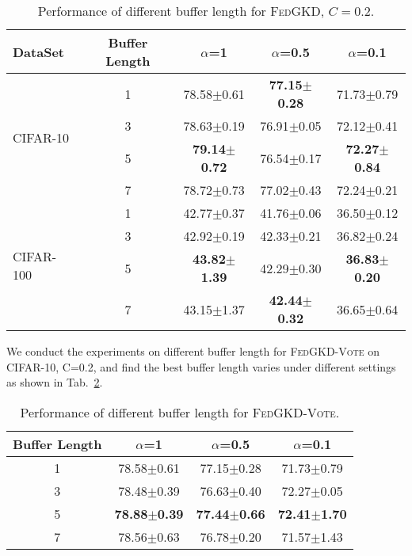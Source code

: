 \documentclass{article} %
\newcommand{\system}{\textsc{FedGKD}\xspace}
\newcommand{\systemled}{\textsc{FedGKD-Vote}\xspace}
\begin{document}
\begin{table}[!htb]
\centering
\small
\caption{Performance of different buffer length for \system, $C=0.2$.}
\begin{tabular}{lcccc}
\hline
  DataSet & Buffer Length &  $\alpha$=1 & $\alpha$=0.5 & $\alpha$=0.1\\
  \hline
   \multirow{4}{*}{CIFAR-10}& 1 & 78.58$\pm$0.61 & \bf{77.15$\pm$0.28} & 71.73$\pm$0.79  \\ 
    &3 & 78.63$\pm$0.19 & 76.91$\pm$0.05 & 72.12$\pm$0.41 \\
    &5 & \bf{79.14$\pm$0.72} & 76.54$\pm$0.17 & \bf{72.27$\pm$0.84}\\
    &7 & 78.72$\pm$0.73 & 77.02$\pm$0.43 & 72.24$\pm$0.21 \\
 \hline
  \multirow{4}{*}{CIFAR-100}& 1 & 42.77$\pm$0.37 & 41.76$\pm$0.06 & 36.50$\pm$0.12  \\ 
    &3 & 42.92$\pm$0.19 & 42.33$\pm$0.21 & 36.82$\pm$0.24 \\
    &5 & \bf{43.82$\pm$1.39} & 42.29$\pm$0.30 & \bf{36.83$\pm$0.20} \\
    &7 & 43.15$\pm$1.37 & \bf{42.44$\pm$0.32} & 36.65$\pm$0.64 \\
    \bottomrule
  \end{tabular}
 
 \label{tbl:avg_teacher_buffer}
\end{table}

We conduct the experiments on different buffer length for \systemled on CIFAR-10, C=0.2, and find the best buffer length varies under different settings as shown in Tab.~\ref{tbl:buffer_length}. 


\begin{table}[h]
\renewcommand\arraystretch{1.1}
\centering
\small
\caption{Performance of different buffer length for \systemled.}
\setlength{\tabcolsep}{2pt} %
\begin{tabular}{cccc}
\hline
  Buffer Length &  $\alpha$=1 & $\alpha$=0.5 & $\alpha$=0.1\\
  \hline
    1 & 78.58$\pm$0.61 & 77.15$\pm$0.28 & 71.73$\pm$0.79  \\ 
    3 & 78.48$\pm$0.39 & 76.63$\pm$0.40 & 72.27$\pm$0.05 \\
    5 & \bf{78.88$\pm$0.39} & \bf{77.44$\pm$0.66} & \bf{72.41$\pm$1.70}\\
    7 & 78.56$\pm$0.63 & 76.78$\pm$0.20 & 71.57$\pm$1.43 \\
    \bottomrule
  \end{tabular}
  
 \label{tbl:buffer_length}
\end{table}
\end{document}
